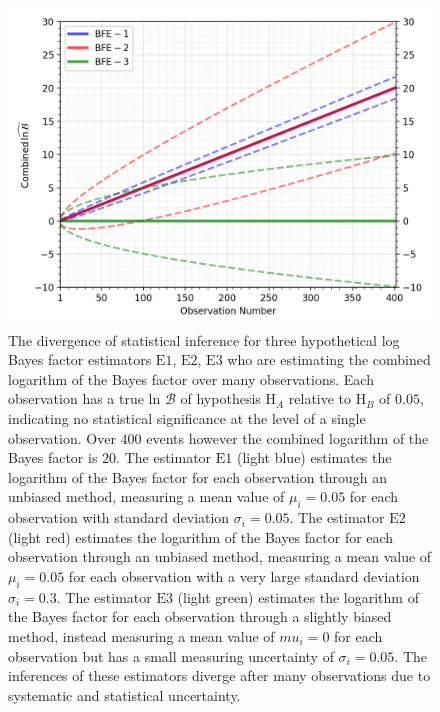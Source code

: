 \begin{figure}[th]
  \includegraphics[width=\textwidth]{figs/chapter5/example_log_bf_divergence.png}
  \caption{The divergence of statistical inference for three hypothetical log Bayes factor estimators $\mathrm{E1}$, $\mathrm{E2}$, $\mathrm{E3}$ who are estimating the combined logarithm of the Bayes factor over many observations. Each observation has a true ln $\mathcal{B}$ of hypothesis $\mathrm{H}_A$ relative to $\mathrm{H}_B$ of $0.05$, indicating no statistical significance at the level of a single observation. Over $400$ events however the combined logarithm of the Bayes factor is $20$. The estimator $\mathrm{E1}$ (light blue) estimates the logarithm of the Bayes factor for each observation through an unbiased method, measuring a mean value of $\mu_i = 0.05$ for each observation with standard deviation $\sigma_i = 0.05$. The estimator $\mathrm{E2}$ (light red) estimates the logarithm of the Bayes factor for each observation through an unbiased method, measuring a mean value of $\mu_i = 0.05$ for each observation with a very large standard deviation $\sigma_i=0.3$. The estimator $\mathrm{E3}$ (light green) estimates the logarithm of the Bayes factor for each observation through a slightly biased method, instead measuring a mean value of $mu_i = 0$ for each observation but has a small measuring uncertainty of $\sigma_i=0.05$. The inferences of these estimators diverge after many observations due to systematic and statistical uncertainty.}
  \label{fig:LBFE}
\end{figure}


